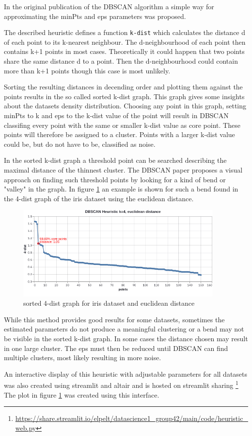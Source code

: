 In the original publication of the DBSCAN algorithm \cite{dbscan} a simple way for approximating the minPts and eps parameters was proposed.

The described heuristic defines a function \texttt{k-dist} which calculates the distance d of each point to its k-nearest neighbour.
The d-neighbourhood of each point then contains k+1 points in most cases. Theoretically it could happen that two points share the same distance d to a point. Then the d-neighbourhood could contain more than k+1 points though this case is most unlikely.

Sorting the resulting distances in decending order and plotting them against the points results in the so called sorted k-dist graph. This graph gives some insights about the datasets density distribution. Choosing any point in this graph, setting minPts to k and eps to the k-dist value of the point will result in DBSCAN classifing every point with the same or smaller k-dist value as core point. These points will therefore be assigned to a cluster. Points with a larger k-dist value could be, but do not have to be, classified as noise. 

In the sorted k-dist graph a threshold point can be searched describing the maximal distance of the thinnest cluster. The DBSCAN paper \cite{dbscan} proposes a visual approach on finding such threshold points by looking for a kind of bend or "valley" in the graph. 
In figure \ref{fig:sorteddistgraphiriseucl} an example is shown for such a bend found in the 4-dist graph of the iris dataset using the euclidean distance.

\begin{figure}
    \includegraphics[width=0.92\textwidth]{../plots/dbscan/iris_4dist_euclidean}
    \caption{sorted 4-dist graph for iris dataset and euclidean distance}
    \label{fig:sorteddistgraphiriseucl}
\end{figure}

While this method provides good results for some datasets, sometimes the estimated parameters do not produce a meaningful clustering or a bend may not be visible in the sorted k-dist graph. In some cases the distance chosen may result in one large cluster. The eps must then be reduced until DBSCAN can find multiple clusters, most likely resulting in more noise.

An interactive display of this heuristic with adjustable parameters for all datasets was also created using streamlit and altair and is hosted on streamlit sharing 
\footnote{\scriptsize\url{https://share.streamlit.io/elpelt/datascience1_group42/main/code/heuristic_web.py}}
The plot in figure \ref{fig:sorteddistgraphiriseucl} was created using this interface.
